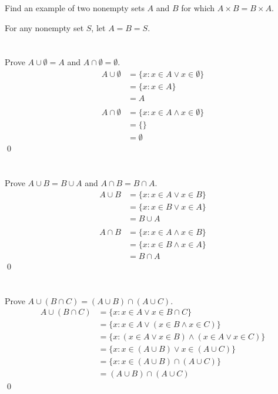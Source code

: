 Find an example of two nonempty sets $A$ and $B$ for which $A \times B = B \times A$.
\hr

For any nonempty set $S$, let $A = B = S$.

\section{}\label{sec:1-4}

Prove $A \cup \emptyset = A$ and $A \cap \emptyset = \emptyset$.
\hr
\begin{align*}
    A \cup \emptyset &= \{x : x \in A \lor x \in \emptyset\} \\
    &= \{x : x \in A\} \\
    &= A \\
    \\
    A \cap \emptyset &= \{x : x \in A \land x \in \emptyset\} \\
    &= \{\} \\
    &= \emptyset
\end{align*}\qed

\section{}\label{sec:1-5}

Prove $A \cup B = B \cup A$ and $A \cap B = B \cap A$.
\hr
\begin{align*}
    A \cup B &= \{x : x \in A \lor x \in B\} \\
    &= \{x : x \in B \lor x \in A\} \\
    &= B \cup A \\
    \\
    A \cap B &= \{x : x \in A \land x \in B\} \\
    &= \{x : x \in B \land x \in A\} \\
    &= B \cap A
\end{align*}\qed

\section{}\label{sec:1-6}

Prove $A \cup (B \cap C) = (A \cup B) \cap (A \cup C)$.
\hr
\begin{align*}
    A \cup (B \cap C) &= \{x : x \in A \lor x \in B \cap C\} \\
    &= \{x : x \in A \lor (x \in B \land x \in C)\} \\
    &= \{x : (x \in A \lor x \in B) \land (x \in A \lor x \in C)\} \\
    &= \{x : x \in (A \cup B) \lor x \in (A \cup C)\} \\
    &= \{x : x \in (A \cup B) \cap (A \cup C)\} \\
    &= (A \cup B) \cap (A \cup C)
\end{align*}\qed
\pagebreak
